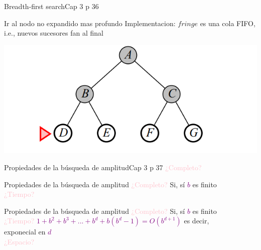 \documentclass{beamer}
\theoremstyle{definition}
\theoremstyle{theorem}
\theoremstyle{remark}
\begin{document}
\begin{frame}{Breadth-first search}{Cap 3 p 36}
    \begin{right}
        
        Ir al nodo no expandido mas profundo
        Implementacion:
        $fringe$ es una cola FIFO, i.e., nuevos sucesores fan al final
        
        \includegraphics[scale = 0.5]{tree_bfs_p36.PNG}
        
    \end{right}
\end{frame}

\begin{frame}{Propiedades de la búsqueda de amplitud}{Cap 3 p 37}
    \textcolor{Pink}{¿Completo?}
\end{frame}

\begin{frame}{Propiedades de la búsqueda de amplitud}
    \textcolor{Pink}{¿Completo?} Si, sí \textcolor{Purple}{$b$} es finito \\
    \textcolor{Pink}{¿Tiempo?}
\end{frame}

\begin{frame}{Propiedades de la búsqueda de amplitud}
    \textcolor{Pink}{¿Completo?} Si, sí \textcolor{Purple}{$b$} es finito \\
    \textcolor{Pink}{¿Tiempo?} \textcolor{Purple}{$1+b^2+b^3+...+b^d+b(b^d-1)=O(b^{d+1})$} es decir,\\    \hspace{9.3cm} exponecial en \textcolor{Purple}{$d$} \\
    \textcolor{Pink}{¿Espacio?} \\
\end{frame}
\end{document}
